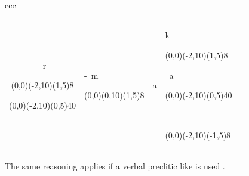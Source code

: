 \begin{tabular}{ccc}
\begin{tabular}{cllll}
~r\begin{picture}(0,0)\put(-2,10){\line(1,5){8}}\end{picture}
\E\begin{picture}(0,0)\put(-2,10){\line(0,5){40}}\end{picture}&
-~m\begin{picture}(0,0)\put(0,10){\line(1,5){8}}\end{picture} &
a   &
k\begin{picture}(0,0)\put(-2,10){\line(1,5){8}}\end{picture}
~a\begin{picture}(0,0)\put(-2,10){\line(0,5){40}}\end{picture}
~\ng\begin{picture}(0,0)\put(-2,10){\line(-1,5){8}}\end{picture}\\
	\end{tabular}
\end{tabular}
\z

The same reasoning applies if a verbal preclitic like  is used .

